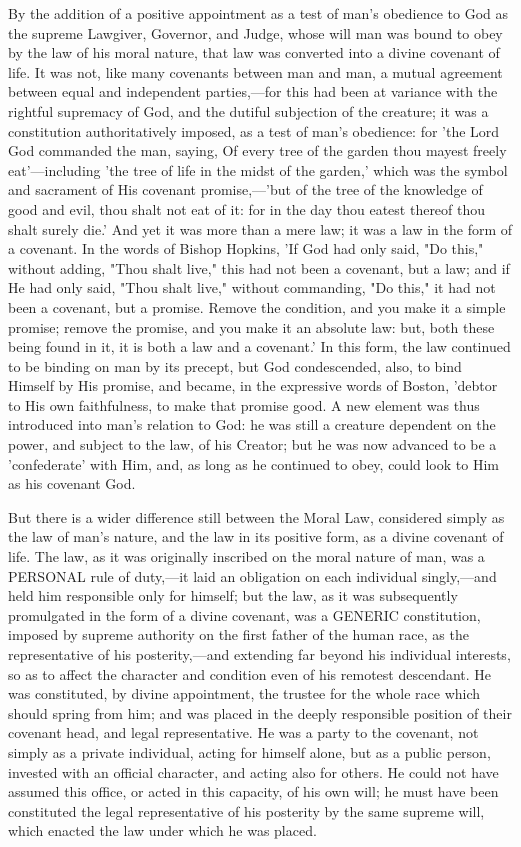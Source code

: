 \documentclass[
]{book}
\begin{document}
By the addition of a positive appointment as a test of man's obedience to God as the supreme Lawgiver, Governor, and Judge, whose will man was bound to obey by the law of his moral nature, that law was converted into a divine covenant of life. It was not, like many covenants between man and man, a mutual agreement between equal and independent parties,---for this had been at variance with the rightful supremacy of God, and the dutiful subjection of the creature; it was a constitution authoritatively imposed, as a test of man's obedience: for 'the Lord God commanded the man, saying, Of every tree of the garden thou mayest freely eat'---including 'the tree of life in the midst of the garden,' which was the symbol and sacrament of His covenant promise,---'but of the tree of the knowledge of good and evil, thou shalt not eat of it: for in the day thou eatest thereof thou shalt surely die.' And yet it was more than a mere law; it was a law in the form of a covenant. In the words of Bishop Hopkins, 'If God had only said, "Do this," without adding, "Thou shalt live," this had not been a covenant, but a law; and if He had only said, "Thou shalt live," without commanding, "Do this," it had not been a covenant, but a promise. Remove the condition, and you make it a simple promise; remove the promise, and you make it an absolute law: but, both these being found in it, it is both a law and a covenant.' In this form, the law continued to be binding on man by its precept, but God condescended, also, to bind Himself by His promise, and became, in the expressive words of Boston, 'debtor to His own faithfulness, to make that promise good. A new element was thus introduced into man's relation to God: he was still a creature dependent on the power, and subject to the law, of his Creator; but he was now advanced to be a 'confederate' with Him, and, as long as he continued to obey, could look to Him as his covenant God.

But there is a wider difference still between the Moral Law, considered simply as the law of man's nature, and the law in its positive form, as a divine covenant of life. The law, as it was originally inscribed on the moral nature of man, was a PERSONAL rule of duty,---it laid an obligation on each individual singly,---and held him responsible only for himself; but the law, as it was subsequently promulgated in the form of a divine covenant, was a GENERIC constitution, imposed by supreme authority on the first father of the human race, as the representative of his posterity,---and extending far beyond his individual interests, so as to affect the character and condition even of his remotest descendant. He was constituted, by divine appointment, the trustee for the whole race which should spring from him; and was placed in the deeply responsible position of their covenant head, and legal representative. He was a party to the covenant, not simply as a private individual, acting for himself alone, but as a public person, invested with an official character, and acting also for others. He could not have assumed this office, or acted in this capacity, of his own will; he must have been constituted the legal representative of his posterity by the same supreme will, which enacted the law under which he was placed.
\end{document}
